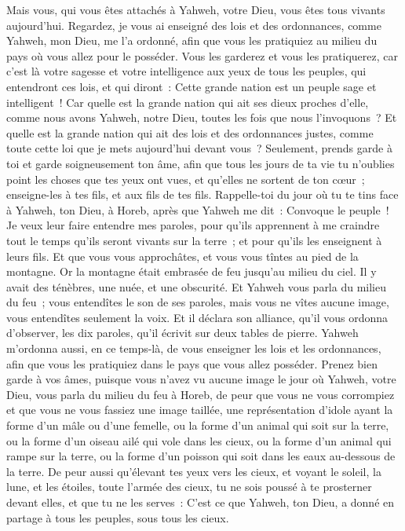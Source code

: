 \begin{multicols}{2}
Mais vous, qui vous êtes attachés à Yahweh, votre Dieu, vous êtes tous vivants aujourd'hui.
Regardez, je vous ai enseigné des lois et des ordonnances, comme Yahweh, mon Dieu, me l'a ordonné, afin que vous les pratiquiez au milieu du pays où vous allez pour le posséder.
Vous les garderez et vous les pratiquerez, car c'est là votre sagesse et votre intelligence aux yeux de tous les peuples, qui entendront ces lois, et qui diront~: Cette grande nation est un peuple sage et intelligent~!
Car quelle est la grande nation qui ait ses dieux proches d'elle, comme nous avons Yahweh, notre Dieu, toutes les fois que nous l'invoquons~?
Et quelle est la grande nation qui ait des lois et des ordonnances justes, comme toute cette loi que je mets aujourd'hui devant vous~?
Seulement, prends garde à toi et garde soigneusement ton âme, afin que tous les jours de ta vie tu n'oublies point les choses que tes yeux ont vues, et qu'elles ne sortent de ton cœur~; enseigne-les à tes fils, et aux fils de tes fils.
Rappelle-toi du jour où tu te tins face à Yahweh, ton Dieu, à Horeb, après que Yahweh me dit~: Convoque le peuple~! Je veux leur faire entendre mes paroles, pour qu'ils apprennent à me craindre tout le temps qu'ils seront vivants sur la terre~; et pour qu'ils les enseignent à leurs fils.
Et que vous vous approchâtes, et vous vous tîntes au pied de la montagne. Or la montagne était embrasée de feu jusqu'au milieu du ciel. Il y avait des ténèbres, une nuée, et une obscurité.
Et Yahweh vous parla du milieu du feu~; vous entendîtes le son de ses paroles, mais vous ne vîtes aucune image, vous entendîtes seulement la voix.
Et il déclara son alliance, qu'il vous ordonna d'observer, les dix paroles, qu'il écrivit sur deux tables de pierre.
Yahweh m'ordonna aussi, en ce temps-là, de vous enseigner les lois et les ordonnances, afin que vous les pratiquiez dans le pays que vous allez posséder.
Prenez bien garde à vos âmes, puisque vous n'avez vu aucune image le jour où Yahweh, votre Dieu, vous parla du milieu du feu à Horeb,
de peur que vous ne vous corrompiez et que vous ne vous fassiez une image taillée, une représentation d'idole ayant la forme d'un mâle ou d'une femelle,
ou la forme d'un animal qui soit sur la terre, ou la forme d'un oiseau ailé qui vole dans les cieux,
ou la forme d'un animal qui rampe sur la terre, ou la forme d'un poisson qui soit dans les eaux au-dessous de la terre.
De peur aussi qu'élevant tes yeux vers les cieux, et voyant le soleil, la lune, et les étoiles, toute l'armée des cieux, tu ne sois poussé à te prosterner devant elles, et que tu ne les serves~: C'est ce que Yahweh, ton Dieu, a donné en partage à tous les peuples, sous tous les cieux.

\end{multicols}
